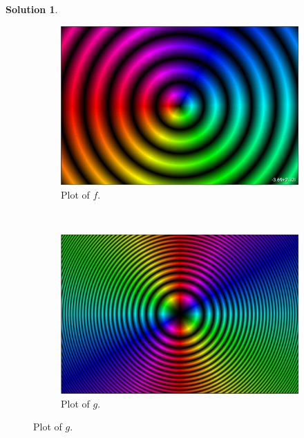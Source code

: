 \documentclass[12pt]{report} %
\theoremstyle{definition}
\newtheorem{solution}{Solution}
\begin{document}
\begin{solution}~
\begin{figure}[H]
    \centering
   \begin{subfigure}[h]{0.45\textwidth}
        \includegraphics[width=\textwidth]{Images/z_plot.png}
        \caption{Plot of $f$.}
    \end{subfigure}
    ~ 
    \begin{subfigure}[h]{0.45\textwidth}
        \includegraphics[width=\textwidth]{Images/z2_plot.png}
        \caption{Plot of $g$.}
    \end{subfigure}
    

\end{figure}
\end{solution}
\end{document}
